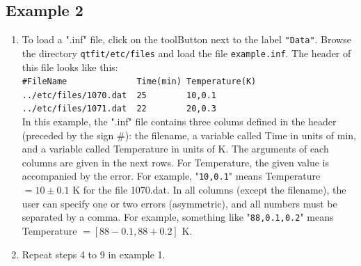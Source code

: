 \documentclass[10pt,letterpaper,oneside]{article}
\begin{document}
\subsection{Example 2}
\begin{enumerate}
\item To load a ".inf" file, click on the toolButton next to the label \verb+"Data"+. 
Browse the directory \verb+qtfit/etc/files+ and load the file \verb+example.inf+.
The header of this file looks like this:\\
\verb+#FileName              Time(min) Temperature(K)+\\
\verb+../etc/files/1070.dat  25        10,0.1+ \\
\verb+../etc/files/1071.dat  22        20,0.3+\\
In this example, the ".inf" file contains three colums defined in the header 
(preceded by the sign $\#$): the filename, a variable called Time in units of min, and 
a variable called Temperature in units of K. The arguments of each columns are given in the next rows.
For Temperature, the given value is accompanied by the error.  For example, "\verb+10,0.1+" means Temperature $= 10\pm0.1$ K for the file 1070.dat. In all columns (except the filename), 
the user can specify one or two errors (asymmetric),
and all numbers must be separated by a comma.  
For example, something like "\verb+88,0.1,0.2+" means Temperature $=[88-0.1,88+0.2]$ K.
\item Repeat steps 4 to 9 in example 1.
\end{enumerate}
\end{document}
